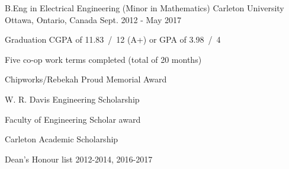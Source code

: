 

\begin{cventries}

  \cventry
    {B.Eng in Electrical Engineering (Minor in Mathematics)} %
    {Carleton University} %
    {Ottawa, Ontario, Canada} %
    {Sept. 2012 - May 2017} %
    {
      \begin{cvitems} %
        \item {Graduation CGPA of 11.83~/~12 (A+) or GPA of 3.98~/~4} %
        \item {Five co-op work terms completed (total of 20 months)}
        \item {Chipworks/Rebekah Proud Memorial Award}
        \item {W. R. Davis Engineering Scholarship}
        \item {Faculty of Engineering Scholar award}
        \item {Carleton Academic Scholarship}
        \item {Dean's Honour list 2012-2014, 2016-2017}
      \end{cvitems}
    }

\end{cventries}
